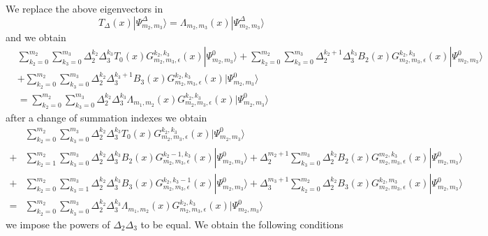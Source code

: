 \documentclass[11pt]{article}
\numberwithin{equation}{section}
\numberwithin{equation}{subsection}
\begin{document}
We replace the above eigenvectors in 
\begin{equation}\label{eigDELTA}
T_{\Delta}(x)|\Psi_{m_{2},m_{3}}^{\Delta}\rangle=\Lambda_{m_{2},m_{3}}(x)|\Psi_{m_{2},m_{3}}^{\Delta}\rangle
\end{equation}
and we obtain
\begin{align*}
&\sum_{k_{2}=0}^{m_{2}}\sum_{k_{3}=0}^{m_{3}}\Delta_{2}^{k_{2}}\Delta_{3}^{k_{3}}T_{0}(x)G_{m_{2},m_{3},\epsilon}^{k_{2},k_{3}}(x)|\Psi_{m_{2},m_{3}}^{0}\rangle+\sum_{k_{2}=0}^{m_{2}}\sum_{k_{3}=0}^{m_{3}}\Delta_{2}^{k_{2}+1}\Delta_{3}^{k_{3}}B_{2}(x)G_{m_{2},m_{3},\epsilon}^{k_{2},k_{3}}(x)|\Psi_{m_{2},m_{3}}^{0}\rangle
\\&
+\sum_{k_{2}=0}^{m_{2}}\sum_{k_{3}=0}^{m_{3}}\Delta_{2}^{k_{2}}\Delta_{3}^{k_{3}+1}B_{3}(x)G_{m_{2},m_{3},\epsilon}^{k_{2},k_{3}}(x)|\Psi_{m_{2},m_{3}}^{0}\rangle
\\&=
\sum_{k_{2}=0}^{m_{2}}\sum_{k_{3}=0}^{m_{3}}\Delta_{2}^{k_{2}}\Delta_{3}^{k_{3}}\Lambda_{m_{1},m_{2}}(x)G_{m_{2},m_{3},\epsilon}^{k_{2},k_{3}}(x)|\Psi_{m_{2},m_{3}}^{0}\rangle
\end{align*}
after a change of summation indexes we obtain
\begin{align*}
&\sum_{k_{2}=0}^{m_{2}}\sum_{k_{3}=0}^{m_{3}}\Delta_{2}^{k_{2}}\Delta_{3}^{k_{3}}T_{0}(x)G_{m_{2},m_{3},\epsilon}^{k_{2},k_{3}}(x)|\Psi_{m_{2},m_{3}}^{0}\rangle
\\+&
\sum_{k_{2}=1}^{m_{2}}\sum_{k_{3}=0}^{m_{3}}\Delta_{2}^{k_{2}}\Delta_{3}^{k_{3}}B_{2}(x)G_{m_{2},m_{3},\epsilon}^{k_{2}-1,k_{3}}(x)|\Psi_{m_{2},m_{3}}^{0}\rangle+\Delta_{2}^{m_{2}+1}\sum_{k_{3}=0}^{m_{3}}\Delta_{2}^{k_{2}}B_{2}(x)G_{m_{2},m_{3},\epsilon}^{m_{2},k_{3}}(x)|\Psi_{m_{2},m_{3}}^{0}\rangle
\\+&
\sum_{k_{2}=0}^{m_{2}}\sum_{k_{3}=1}^{m_{3}}\Delta_{2}^{k_{2}}\Delta_{3}^{k_{3}}B_{3}(x)G_{m_{2},m_{3},\epsilon}^{k_{2},k_{3}-1}(x)|\Psi_{m_{2},m_{3}}^{0}\rangle+\Delta_{3}^{m_{3}+1}\sum_{k_{2}=0}^{m_{2}}\Delta_{2}^{k_{2}}B_{3}(x)G_{m_{2},m_{3},\epsilon}^{k_{2},m_{3}}(x)|\Psi_{m_{2},m_{3}}^{0}\rangle
\\=&
\sum_{k_{2}=0}^{m_{2}}\sum_{k_{3}=0}^{m_{3}}\Delta_{2}^{k_{2}}\Delta_{3}^{k_{3}}\Lambda_{m_{1},m_{2}}(x)G_{m_{2},m_{3},\epsilon}^{k_{2},k_{3}}(x)|\Psi_{m_{2},m_{3}}^{0}\rangle
\end{align*}
we impose the powers of $\Delta_{2}\Delta_{3}$ to be equal. We obtain the following conditions 
\end{document}
